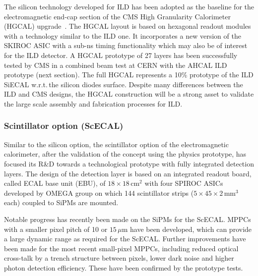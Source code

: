  The silicon technology developed for ILD has been adopted as the baseline for the electromagnetic end-cap section of the CMS High Granularity Calorimeter (HGCAL) upgrade~\cite{Collaboration:2293646}.
 The HGCAL layout is based on hexagonal readout modules with a technology similar to the ILD one. It incorporates a new version of the SKIROC ASIC with a sub-ns timing functionality which may also be of interest for the ILD detector.
 A HGCAL prototype of 27 layers has been successfully tested by CMS in a combined beam test at CERN with the AHCAL ILD prototype (next section). The full HGCAL represents a 10\% prototype of the ILD SiECAL w.r.t.\,the silicon diodes surface.
 Despite many differences between the ILD and CMS designs, the HGCAL construction will be a strong asset to validate the large scale assembly and fabrication processes for ILD.


 


\subsubsection{Scintillator option (ScECAL)}

Similar to the silicon option, the scintillator option of the electromagnetic calorimeter,
after the validation of the concept using the physics prototype,
has focused its R\&D towards a technological prototype 
with fully integrated detection layers. 
The design of the detection layer is based on an integrated readout board, 
called ECAL base unit (EBU), of $18\times18\,\mathrm{cm}^2$ 
with four SPIROC ASICs developed by OMEGA group\cite{ild:bib:spiroc} on which 144 scintillator strips 
($5\times45\times2\,\mathrm{mm^3}$ each) coupled to SiPMs are mounted.

Notable progress has recently been made on the SiPMs for the ScECAL. 
MPPCs with a smaller pixel pitch of 10 or $15\,\mu\mathrm{m}$ have been developed, which can provide a large dynamic range as required 
for the ScECAL\cite{ild:bib:hdmppc}. 
Further improvements have been made for the most recent small-pixel MPPCs, 
including reduced optical cross-talk by a trench structure between pixels, 
lower dark noise and higher photon detection efficiency. These have been confirmed by the prototype tests.

